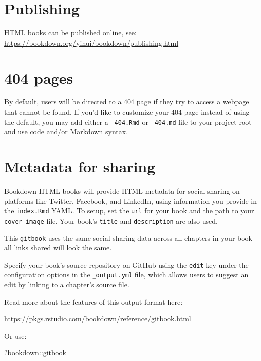 \documentclass[
]{book}
\newenvironment{Shaded}{\begin{snugshade}}{\end{snugshade}}
\newcommand{\NormalTok}[1]{#1}
\newcommand{\SpecialCharTok}[1]{\textcolor[rgb]{0.00,0.00,0.00}{#1}}
\theoremstyle{definition}
\theoremstyle{definition}
\theoremstyle{definition}
\theoremstyle{definition}
\theoremstyle{remark}
\begin{document}
\hypertarget{publishing}{%
\section{Publishing}\label{publishing}}

HTML books can be published online, see: \url{https://bookdown.org/yihui/bookdown/publishing.html}

\hypertarget{pages}{%
\section{404 pages}\label{pages}}

By default, users will be directed to a 404 page if they try to access a webpage that cannot be found. If you'd like to customize your 404 page instead of using the default, you may add either a \texttt{\_404.Rmd} or \texttt{\_404.md} file to your project root and use code and/or Markdown syntax.

\hypertarget{metadata-for-sharing}{%
\section{Metadata for sharing}\label{metadata-for-sharing}}

Bookdown HTML books will provide HTML metadata for social sharing on platforms like Twitter, Facebook, and LinkedIn, using information you provide in the \texttt{index.Rmd} YAML. To setup, set the \texttt{url} for your book and the path to your \texttt{cover-image} file. Your book's \texttt{title} and \texttt{description} are also used.

This \texttt{gitbook} uses the same social sharing data across all chapters in your book- all links shared will look the same.

Specify your book's source repository on GitHub using the \texttt{edit} key under the configuration options in the \texttt{\_output.yml} file, which allows users to suggest an edit by linking to a chapter's source file.

Read more about the features of this output format here:

\url{https://pkgs.rstudio.com/bookdown/reference/gitbook.html}

Or use:

\begin{Shaded}
\begin{Highlighting}[]
\NormalTok{?bookdown}\SpecialCharTok{::}\NormalTok{gitbook}
\end{Highlighting}
\end{Shaded}


  
\end{document}
